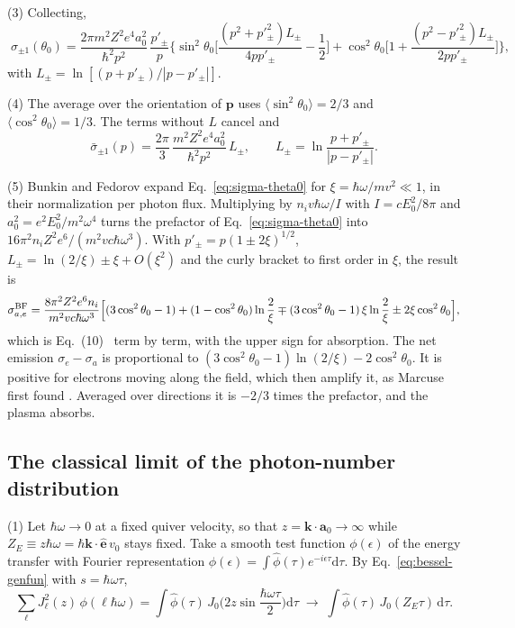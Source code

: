 \documentclass[11pt]{article}
\numberwithin{equation}{section}
\newcommand{\ehat}{\hat{\mathbf e}}
\newcommand{\av}{\mathbf a_0}
\newcommand{\kv}{\mathbf k}
\newcommand{\pv}{\mathbf p}
\newcommand{\dd}{\mathrm d}
\begin{document}
{\noindent}(3) Collecting,
\begin{equation}
\boxed{\;\sigma_{\pm1}(\theta_0)=\frac{2\pi m^2Z^2e^4a_0^2}{\hbar^2p^2}\,\frac{p'_\pm}{p}
\Big\{\sin^2\theta_0\Big[\frac{(p^2+p'^2_\pm)L_\pm}{4pp'_\pm}-\frac12\Big]
+\cos^2\theta_0\Big[1+\frac{(p^2-p'^2_\pm)L_\pm}{2pp'_\pm}\Big]\Big\},\;}
\label{eq:sigma-theta0}
\end{equation}
with $L_\pm=\ln[(p+p'_\pm)/|p-p'_\pm|]$.

{\noindent}(4) The average over the orientation of $\pv$ uses
$\langle\sin^2\theta_0\rangle=2/3$ and $\langle\cos^2\theta_0\rangle=1/3$. The
terms without $L$ cancel and
\begin{equation}
\boxed{\;\bar\sigma_{\pm1}(p)=\frac{2\pi}{3}\,\frac{m^2Z^2e^4a_0^2}{\hbar^2p^2}\,L_\pm,\qquad
L_\pm=\ln\frac{p+p'_\pm}{|p-p'_\pm|}.\;}
\label{eq:sigma-iso}
\end{equation}

{\noindent}(5) Bunkin and Fedorov expand Eq.~\eqref{eq:sigma-theta0} for
$\xi=\hbar\omega/mv^2\ll1$, in their normalization per photon flux.
Multiplying by $n_iv\hbar\omega/I$ with $I=cE_0^2/8\pi$ and
$a_0^2=e^2E_0^2/m^2\omega^4$ turns the prefactor of
Eq.~\eqref{eq:sigma-theta0} into $16\pi^2n_iZ^2e^6/(m^2vc\hbar\omega^3)$. With
$p'_\pm=p(1\pm2\xi)^{1/2}$, $L_\pm=\ln(2/\xi)\pm\xi+O(\xi^2)$ and the curly
bracket to first order in $\xi$, the result is
\begin{equation}
\sigma^{\rm BF}_{a,e}=\frac{8\pi^2Z^2e^6n_i}{m^2vc\hbar\omega^3}\Big[(3\cos^2\theta_0-1)
+(1-\cos^2\theta_0)\ln\frac2\xi\mp(3\cos^2\theta_0-1)\,\xi\ln\frac2\xi\pm2\xi\cos^2\theta_0\Big],
\label{eq:bf10}
\end{equation}
which is Eq.~(10)~\cite{BunkinFedorov1966} term by term, with the upper sign for
absorption. The net emission $\sigma_e-\sigma_a$ is proportional to
$(3\cos^2\theta_0-1)\ln(2/\xi)-2\cos^2\theta_0$. It is positive for electrons
moving along the field, which then amplify it, as Marcuse first found
\cite{Marcuse1962}. Averaged over directions it is $-2/3$ times the
prefactor, and the plasma absorbs.

\subsection{The classical limit of the photon-number distribution}
\label{sec:classical-limit}
{\noindent}(1) Let $\hbar\omega\to0$ at a fixed quiver velocity, so that
$z=\kv\cdot\av\to\infty$ while $Z_E\equiv z\hbar\omega=\hbar\kv\cdot\ehat\,v_0$
stays fixed. Take a smooth test function $\phi(\epsilon)$ of the energy
transfer with Fourier representation $\phi(\epsilon)=\int\hat\phi(\tau)e^{-i\epsilon\tau}\dd\tau$.
By Eq.~\eqref{eq:bessel-genfun} with $s=\hbar\omega\tau$,
\begin{equation}
\sum_\ell J_\ell^2(z)\,\phi(\ell\hbar\omega)=\int\hat\phi(\tau)\,J_0\Big(2z\sin\frac{\hbar\omega\tau}{2}\Big)\dd\tau
\;\longrightarrow\;\int\hat\phi(\tau)\,J_0(Z_E\tau)\,\dd\tau.
\end{equation}
\end{document}
